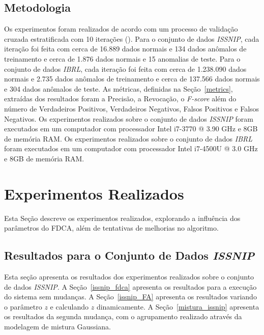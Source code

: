 \documentclass[cic,tc]{iiufrgs}
\begin{document}
\subsection{Metodologia}
Os experimentos foram realizados de acordo com um processo de validação cruzada estratificada com 10 iterações (\cite{bootstrap1997}). Para o conjunto de dados \textit{ISSNIP}, cada iteração foi feita com cerca de 16.889 dados normais e 134 dados anômalos de treinamento e cerca de 1.876 dados normais e 15 anomalias de teste. Para o conjunto de dados \textit{IBRL}, cada iteração foi feita com cerca de 1.238.090 dados normais e 2.735 dados anômalos de treinamento e cerca de 137.566 dados normais e 304 dados anômalos de teste. As métricas, definidas na Seção~\ref{metrics}, extraídas dos resultados foram a Precisão, a Revocação, o \textit{F-score} além do número de Verdadeiros Positivos, Verdadeiros Negativos, Falsos Positivos e Falsos Negativos. Os experimentos realizados sobre o conjunto de dados \textit{ISSNIP} foram executados em um computador com processador Intel i7-3770 @ 3.90 GHz e 8GB de memória RAM. Os experimentos realizados sobre o conjunto de dados \textit{IBRL} foram executados em um computador com processador Intel i7-4500U @ 3.0 GHz e 8GB de memória RAM.  

\section{Experimentos Realizados}
Esta Seção descreve os experimentos realizados, explorando a influência dos parâmetros do FDCA, além de tentativas de melhorias no algoritmo.

\subsection{Resultados para o Conjunto de Dados \textit{ISSNIP}}
\label{res_issnip}
Esta seção apresenta os resultados dos experimentos realizados sobre o conjunto de dados \textit{ISSNIP}. A Seção~\ref{issnip_fdca} apresenta os resultados para a execução do sistema sem mudanças. A Seção~\ref{issnip_FA} apresenta os resultados variando o parâmetro $z$ e calculando $z$ dinamicamente. A Seção~\ref{mistura_issnip} apresenta os resultados da segunda mudança, com o agrupamento realizado através da modelagem de mistura Gaussiana.
\end{document}
